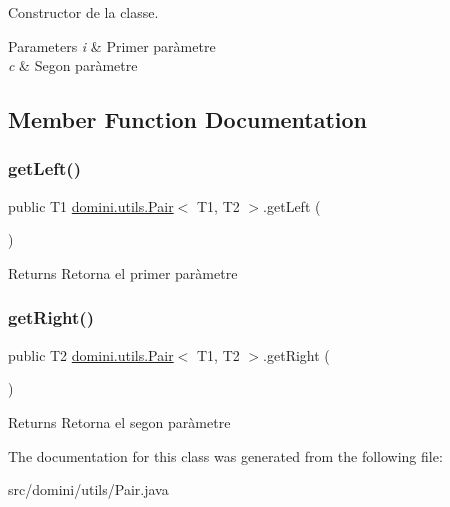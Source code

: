 Constructor de la classe. 


\begin{DoxyParams}{Parameters}
{\em i} & Primer paràmetre \\
\hline
{\em c} & Segon paràmetre \\
\hline
\end{DoxyParams}


\subsection{Member Function Documentation}
\mbox{\label{classdomini_1_1utils_1_1Pair_a9439fbd8488cb1fbf00c57f15f093c4b}} 
\subsubsection{\texorpdfstring{get\+Left()}{getLeft()}}
{\footnotesize\ttfamily public T1 \hyperlink{classdomini_1_1utils_1_1Pair}{domini.\+utils.\+Pair}$<$ T1, T2 $>$.get\+Left (\begin{DoxyParamCaption}{ }\end{DoxyParamCaption})\hspace{0.3cm}{\ttfamily [inline]}}

\begin{DoxyReturn}{Returns}
Retorna el primer paràmetre 
\end{DoxyReturn}
\mbox{\label{classdomini_1_1utils_1_1Pair_a0dca94eb1a43952258bebe1dca4c84e9}} 
\subsubsection{\texorpdfstring{get\+Right()}{getRight()}}
{\footnotesize\ttfamily public T2 \hyperlink{classdomini_1_1utils_1_1Pair}{domini.\+utils.\+Pair}$<$ T1, T2 $>$.get\+Right (\begin{DoxyParamCaption}{ }\end{DoxyParamCaption})\hspace{0.3cm}{\ttfamily [inline]}}

\begin{DoxyReturn}{Returns}
Retorna el segon paràmetre 
\end{DoxyReturn}


The documentation for this class was generated from the following file\+:\begin{DoxyCompactItemize}
\item 
src/domini/utils/Pair.\+java\end{DoxyCompactItemize}
